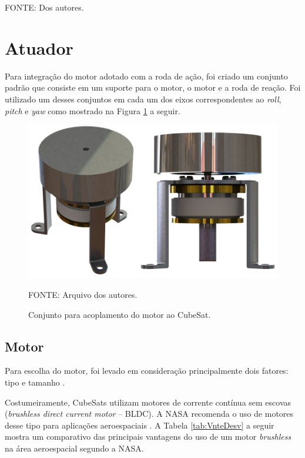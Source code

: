 \documentclass[
	12pt,				%
	openany,			%
	twoside,			%
	a4paper,			%
	english,			%
	french,				%
	spanish,			%
	brazil,				%
	oldfontcommands
	]{abntex2}
\begin{document}
\begin{table}[h]
	\begin{small}
	\vspace{3pt}	
	FONTE: Dos autores.
	\end{small}
	\label{tab:CompElet}
\end{table}

\newpage

\section{Atuador}

Para integração do motor adotado com a roda de ação, foi criado um conjunto padrão que consiste em um suporte para o motor, o motor e a roda de reação. Foi utilizado um desses conjuntos em cada um dos eixos correspondentes ao \textit{roll}, \textit{pitch} e \textit{yaw} como mostrado na Figura \ref{fig:MotSet} a seguir.

\begin{figure}[th]
	\caption{Conjunto para acoplamento do motor ao CubeSat.}
	\centering
	\includegraphics[width=0.7\linewidth]{./figs/Motor_Set}
	
	\begin{small}
		FONTE: Arquivo dos autores.
	\end{small}
	\label{fig:MotSet}
\end{figure}

\newpage

\subsection{Motor}

Para escolha do motor, foi levado em consideração principalmente dois fatores: tipo e tamanho \cite{Ericksson}.

Costumeiramente, CubeSats utilizam motores de corrente contínua sem escovas (\textit{brushless direct current motor} – BLDC). A NASA recomenda o uso de motores desse tipo para aplicações aeroespaciais \cite{NASABLDC}. A Tabela \ref{tab:VnteDesv} a seguir mostra um comparativo das principais vantagens do uso de um motor \textit{brushless} na área aeroespacial segundo a NASA.
\end{document}
